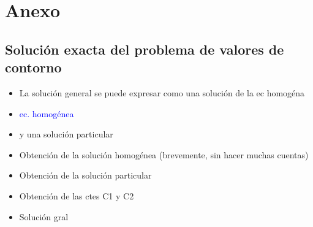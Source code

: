 \documentclass[aps,prb,twocolumn,superscriptaddress,floatfix,longbibliography]{revtex4-2}
\begin{document}
\section{Anexo}

\subsection{Solución exacta del problema de valores de contorno}
\begin{itemize}
    \item La solución general se puede expresar como una solución de la ec homogéna
    \item \textcolor{blue}{ec. homogénea}
    \item y una solución particular
    \item Obtención de la solución homogénea (brevemente, sin hacer muchas cuentas)
    \item Obtención de la solución particular
    \item Obtención de las ctes C1 y C2
    \item Solución gral
\end{itemize}


\end{document}
